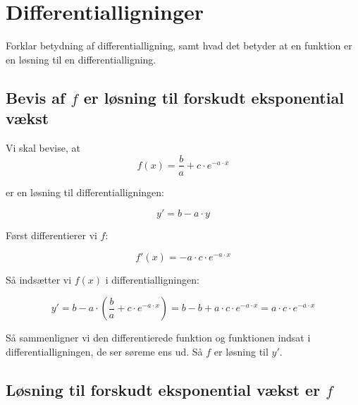 
\section{Differentialligninger}

Forklar betydning af differentialligning, samt hvad det betyder at en funktion er en løsning til en differentialligning.

\subsection{Bevis af $f$ er løsning til forskudt eksponential vækst}

\begin{proofw}
    Vi skal bevise, at
    $$f(x)=\frac{b}{a}+c\cdot e^{-a \cdot x}$$
    
    er en løsning til differentialligningen:

    $$y'=b-a\cdot y$$

    Først differentierer vi $f$:

    $$
        f'(x)=-a\cdot c\cdot e^{-a\cdot x}
    $$

    Så indsætter vi $f(x)$ i differentialligningen:

    $$
        y'=b-a \cdot \left(\frac{b}{a}+c \cdot e^{-a\cdot x} \right)=b-b+a\cdot c\cdot e^{-a\cdot x}=a\cdot c\cdot e^{-a\cdot x}
    $$

    Så sammenligner vi den differentierede funktion og funktionen indsat i differentialligningen,
    de ser søreme ens ud. Så $f$ er løsning til $y'$.
\end{proofw}

\subsection{Løsning til forskudt eksponential vækst er $f$}

